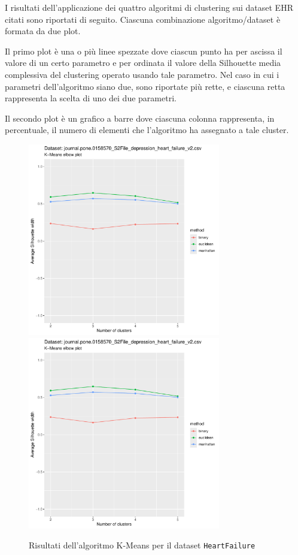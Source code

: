 \documentclass[a4paper, 12pt]{report}
\begin{document}
			I risultati dell'applicazione dei quattro algoritmi di clustering
			sui dataset EHR citati sono riportati di seguito. Ciascuna
			combinazione algoritmo/dataset è formata da due plot.

			Il primo plot è una o più linee spezzate dove ciascun punto ha per
			ascissa il valore di un certo parametro e per ordinata il valore
			della Silhouette media complessiva del clustering operato usando
			tale parametro. Nel caso in cui i parametri dell'algoritmo siano
			due, sono riportate più rette, e ciascuna retta rappresenta la
			scelta di uno dei due parametri.

			Il secondo plot è un grafico a barre dove ciascuna colonna
			rappresenta, in percentuale, il numero di elementi che l'algoritmo
			ha assegnato a tale cluster.

			\begin{figure}[H]
				\centering
				\includegraphics[width = 0.75\textwidth, height = 0.45\textheight, page = 1]{
					results/results_HeartFailure.csv.pdf
				}
				\includegraphics[width = 0.75\textwidth, height = 0.45\textheight, page = 2]{
					results/results_HeartFailure.csv.pdf
				}
				\caption{Risultati dell'algoritmo K-Means per il dataset
				\texttt{HeartFailure}}
				\label{fig:kmeans1}
			\end{figure}
\end{document}
